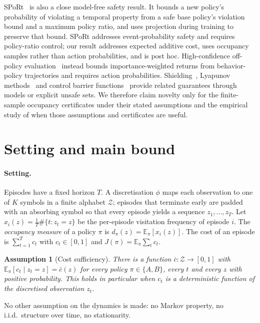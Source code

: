\documentclass{article}
\newtheorem{assumption}{Assumption}
\begin{document}
SPoRt~\citep{cloete2025sport} is also a close model-free safety result. It bounds a new policy's probability of violating a temporal property from a safe base policy's violation bound and a maximum policy ratio, and uses projection during training to preserve that bound. SPoRt addresses event-probability safety and requires policy-ratio control; our result addresses expected additive cost, uses occupancy samples rather than action probabilities, and is post hoc. High-confidence off-policy evaluation~\citep{thomas2015hcope} instead bounds importance-weighted returns from behavior-policy trajectories and requires action probabilities. Shielding~\citep{alshiekh2018shield}, Lyapunov methods~\citep{chow2018lyapunov} and control barrier functions~\citep{cheng2019cbf} provide related guarantees through models or explicit unsafe sets. We therefore claim novelty only for the finite-sample occupancy certificates under their stated assumptions and the empirical study of when those assumptions and certificates are useful.

\section{Setting and main bound}
\label{sec:theory}

\paragraph{Setting.}
Episodes have a fixed horizon $T$. A discretisation $\phi$ maps each observation to one of $K$ symbols in a finite alphabet $\mathcal Z$; episodes that terminate early are padded with an absorbing symbol so that every episode yields a sequence $z_1,\dots,z_T$. Let $x_i(z)=\frac1T\#\{t:z_t=z\}$ be the per-episode visitation frequency of episode $i$. The \emph{occupancy measure} of a policy $\pi$ is $d_\pi(z)=\mathbb E_\pi[x_i(z)]$. The cost of an episode is $\sum_{t=1}^T c_t$ with $c_t\in[0,1]$ and $J(\pi)=\mathbb E_\pi\sum_t c_t$.

\begin{assumption}[Cost sufficiency]\label{asm:suff}
There is a function $\bar c:\mathcal Z\to[0,1]$ with $\mathbb E_\pi[c_t\mid z_t=z]=\bar c(z)$ for every policy $\pi\in\{A,B\}$, every $t$ and every $z$ with positive probability. This holds in particular when $c_t$ is a deterministic function of the discretised observation $z_t$.
\end{assumption}

No other assumption on the dynamics is made: no Markov property, no i.i.d.\ structure over time, no stationarity.
\end{document}
